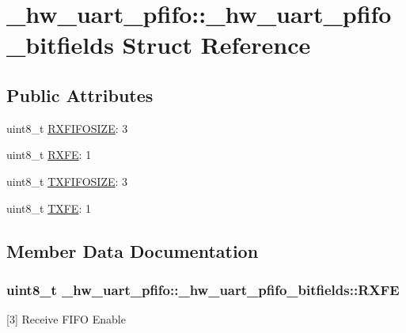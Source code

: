 \hypertarget{struct__hw__uart__pfifo_1_1__hw__uart__pfifo__bitfields}{}\section{\+\_\+hw\+\_\+uart\+\_\+pfifo\+:\+:\+\_\+hw\+\_\+uart\+\_\+pfifo\+\_\+bitfields Struct Reference}
\label{struct__hw__uart__pfifo_1_1__hw__uart__pfifo__bitfields}
\subsection*{Public Attributes}
\begin{DoxyCompactItemize}
\item 
uint8\+\_\+t \hyperlink{struct__hw__uart__pfifo_1_1__hw__uart__pfifo__bitfields_aa52731290b0688aebd0bb8705c7c7d68}{R\+X\+F\+I\+F\+O\+S\+I\+ZE}\+: 3
\item 
uint8\+\_\+t \hyperlink{struct__hw__uart__pfifo_1_1__hw__uart__pfifo__bitfields_a3e41157fd45531b8d8f016eb602c6a59}{R\+X\+FE}\+: 1
\item 
uint8\+\_\+t \hyperlink{struct__hw__uart__pfifo_1_1__hw__uart__pfifo__bitfields_a4d32ae7c22923275548ef29be73cee30}{T\+X\+F\+I\+F\+O\+S\+I\+ZE}\+: 3
\item 
uint8\+\_\+t \hyperlink{struct__hw__uart__pfifo_1_1__hw__uart__pfifo__bitfields_ab2326d1f690556d5c949106a34cdb1a4}{T\+X\+FE}\+: 1
\end{DoxyCompactItemize}


\subsection{Member Data Documentation}
\subsubsection[{\texorpdfstring{R\+X\+FE}{RXFE}}]{\setlength{\rightskip}{0pt plus 5cm}uint8\+\_\+t \+\_\+hw\+\_\+uart\+\_\+pfifo\+::\+\_\+hw\+\_\+uart\+\_\+pfifo\+\_\+bitfields\+::\+R\+X\+FE}\hypertarget{struct__hw__uart__pfifo_1_1__hw__uart__pfifo__bitfields_a3e41157fd45531b8d8f016eb602c6a59}{}\label{struct__hw__uart__pfifo_1_1__hw__uart__pfifo__bitfields_a3e41157fd45531b8d8f016eb602c6a59}
\mbox{[}3\mbox{]} Receive F\+I\+FO Enable 
